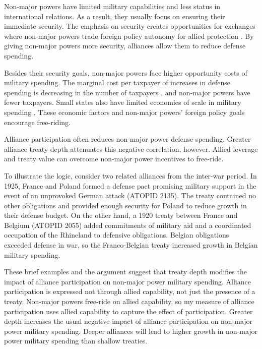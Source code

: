 \documentclass[12pt]{article}
\begin{document}
Non-major powers have limited military capabilities and less status in international relations. 
As a result, they usually focus on ensuring their immediate security.  
The emphasis on security creates opportunities for exchanges where non-major powers trade foreign policy autonomy for allied protection \citep{Altfield1984, Morrow1991}. 
By giving non-major powers more security, alliances allow them to reduce defense spending. 


Besides their security goals, non-major powers face higher opportunity costs of military spending. 
The marginal cost per taxpayer of increases in defense spending is decreasing in the number of taxpayers \citep{DudleyMontmarquette1981}, and non-major powers have fewer taxpayers. 
Small states also have limited economies of scale in military spending \citep{Moravcsik1991, Kapstein1991, Anderton1995, Devore2013}.
These economic factors and non-major powers' foreign policy goals encourage free-riding.  


Alliance participation often reduces non-major power defense spending. 
Greater alliance treaty depth attenuates this negative correlation, however. 
Allied leverage and treaty value can overcome non-major power incentives to free-ride. 


To illustrate the logic, consider two related alliances from the inter-war period. 
In 1925, France and Poland formed a defense pact promising military support in the event of an unprovoked German attack (ATOPID 2135). 
The treaty contained no other obligations and provided enough security for Poland to reduce growth in their defense budget.
On the other hand, a 1920 treaty between France and Belgium (ATOPID 2055) added commitments of military aid and a coordinated occupation of the Rhineland to defensive obligations. 
Belgian obligations exceeded defense in war, so the Franco-Belgian treaty increased growth in Belgian military spending. 
 
 
These brief examples and the argument suggest that treaty depth modifies the impact of alliance participation on non-major power military spending. 
Alliance participation is expressed not through allied capability, not just the presence of a treaty. 
Non-major powers free-ride on allied capability, so my measure of alliance participation uses allied capability to capture the effect of participation. 
Greater depth increases the usual negative impact of alliance participation on non-major power military spending. 
Deeper alliances will lead to higher growth in non-major power military spending than shallow treaties. 
 
\end{document}
